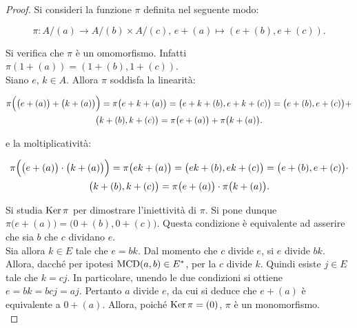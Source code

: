 \documentclass[11pt]{scrbook}
\begin{document}
    \begin{proof}
        Si consideri la funzione $\pi$ definita nel seguente
        modo:
        
        \[ \pi : A/(a) \to A/(b) \times A/(c),\,e + (a) \mapsto (e + (b), e + (c)). \]
        
        \vskip 0.1in
        
        Si verifica che $\pi$ è un omomorfismo. Infatti
        $\pi(1 + (a)) = (1 + (b), 1 + (c))$. \\
        
        Siano $e$, $k \in A$. Allora
        $\pi$ soddisfa la linearità:
        
        \begin{multline*}
            \pi\Bigl(\bigl(e + (a)\bigr) + \bigl(k + (a)\bigr)\Bigr) = \pi\bigl(e + k + (a)\bigr) =
            \bigl(e + k + (b), e + k + (c)\bigr) =
            \bigl(e + (b), e + (c)\bigr) + \\ \bigl(k + (b), k + (c)\bigr) = \pi\bigl(e + (a)\bigr) +
            \pi\bigl(k + (a)\bigr).
        \end{multline*}
        
        \vskip 0.1in
        
        e la moltiplicatività:
        
        \begin{multline*}
            \pi\Bigl(\bigl(e + (a)\bigr) \cdot \bigl(k + (a)\bigr)\Bigr) = \pi\bigl(ek + (a)\bigr) =
            \bigl(ek + (b), ek + (c)\bigr) =
            \bigl(e + (b), e + (c)\bigr) \cdot \\ \bigl(k + (b), k + (c)\bigr) = \pi\bigl(e + (a)\bigr) \cdot
            \pi\bigl(k + (a)\bigr).
        \end{multline*}
        
        \vskip 0.1in
        
        Si studia $\operatorname{Ker} \pi$ per dimostrare l'iniettività di $\pi$.
        Si pone dunque $\pi\bigl(e + (a)\bigr) = \bigl(0 + (b), 0 + (c)\bigr)$.
        Questa condizione è equivalente ad asserire che sia $b$ che $c$ dividano
        $e$. \\
        
        Sia allora $k \in E$ tale che $e=bk$. Dal momento che $c$ divide $e$, si
        $e$ divide $bk$. Allora, dacché per ipotesi $\operatorname{MCD}(a, b) \in E^*$, per la
         $c$ divide $k$. Quindi esiste $j \in E$ tale che
        $k=cj$. In particolare, unendo le due condizioni si ottiene
        $e=bk=bcj=aj$. Pertanto $a$ divide $e$, da cui si deduce che $e + (a)$
        è equivalente a $0 + (a)$. Allora, poiché $\operatorname{Ker} \pi = (0)$, $\pi$ è un
        monomorfismo. \\
        

\end{proof}
\end{document}
